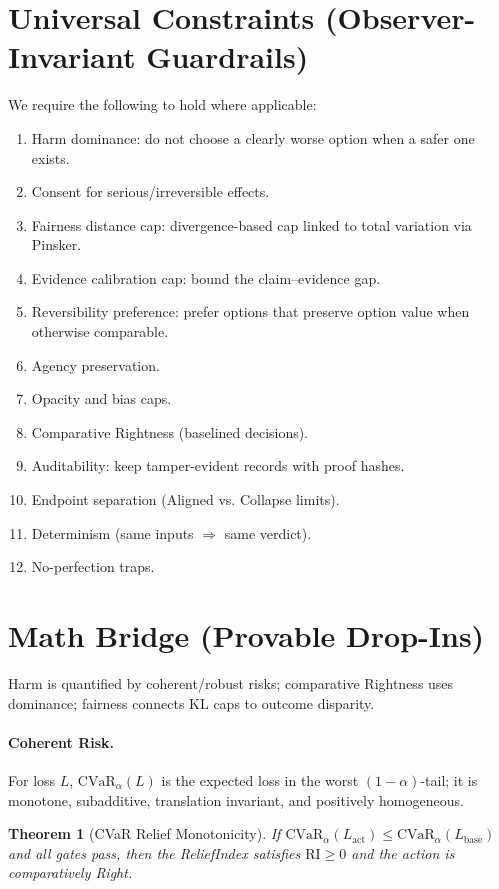 \documentclass[11pt]{article}
\newcommand{\RI}{\mathrm{RI}}
\newcommand{\CVaR}{\mathrm{CVaR}}
\newcommand{\Baseline}{\mathrm{base}}
\theoremstyle{plain}
\newtheorem{theorem}{Theorem}
\theoremstyle{definition}
\begin{document}
\section{Universal Constraints (Observer-Invariant Guardrails)}
We require the following to hold where applicable:
\begin{enumerate}[label=\textbf{UC-\arabic*}, leftmargin=2em]
\item Harm dominance: do not choose a clearly worse option when a safer one exists.
\item Consent for serious/irreversible effects.
\item Fairness distance cap: divergence-based cap linked to total variation via Pinsker.
\item Evidence calibration cap: bound the claim--evidence gap.
\item Reversibility preference: prefer options that preserve option value when otherwise comparable.
\item Agency preservation.
\item Opacity and bias caps.
\item Comparative Rightness (baselined decisions).
\item Auditability: keep tamper-evident records with proof hashes.
\item Endpoint separation (Aligned vs. Collapse limits).
\item Determinism (same inputs $\Rightarrow$ same verdict).
\item No-perfection traps.
\end{enumerate}

\section{Math Bridge (Provable Drop-Ins)}
Harm is quantified by coherent/robust risks; comparative Rightness uses dominance; fairness connects KL caps to outcome disparity.

\paragraph{Coherent Risk.} For loss $L$, $\CVaR_\alpha(L)$ is the expected loss in the worst $(1-\alpha)$-tail; it is monotone, subadditive, translation invariant, and positively homogeneous.
\begin{theorem}[CVaR Relief Monotonicity]
If $\CVaR_\alpha(L_{\text{act}}) \le \CVaR_\alpha(L_{\Baseline})$ and all gates pass, then the ReliefIndex satisfies $\RI \ge 0$ and the action is comparatively Right.
\end{theorem}
\end{document}
